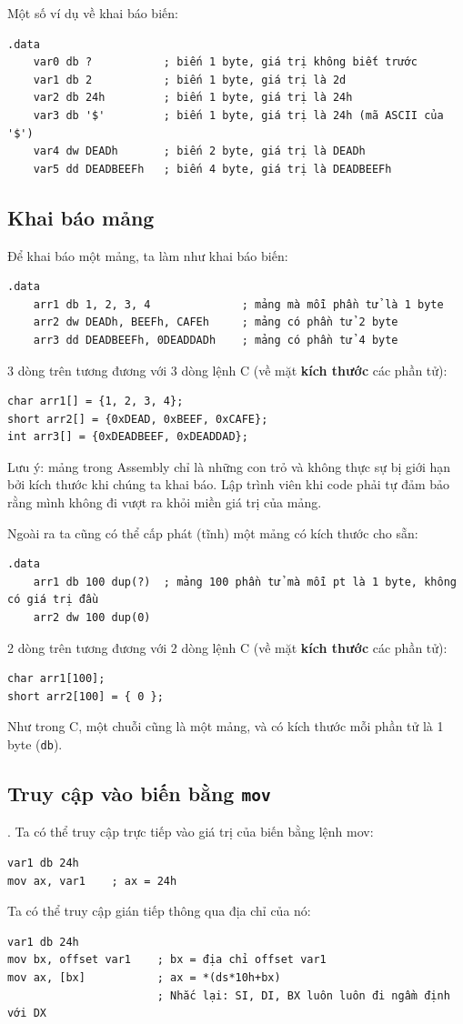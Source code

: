 \documentclass[12pt]{report}
\newcommand{\code}[1]{\texttt{#1}}
\begin{document}
Một số ví dụ về khai báo biến:
\begin{verbatim}
.data 
    var0 db ?           ; biến 1 byte, giá trị không biết trước
    var1 db 2           ; biến 1 byte, giá trị là 2d
    var2 db 24h         ; biến 1 byte, giá trị là 24h
    var3 db '$'         ; biến 1 byte, giá trị là 24h (mã ASCII của '$')
    var4 dw DEADh       ; biến 2 byte, giá trị là DEADh
    var5 dd DEADBEEFh   ; biến 4 byte, giá trị là DEADBEEFh
\end{verbatim}

\subsection{Khai báo mảng}
Để khai báo một mảng, ta làm như khai báo biến:
\begin{verbatim}
.data
    arr1 db 1, 2, 3, 4              ; mảng mà mỗi phần tử là 1 byte
    arr2 dw DEADh, BEEFh, CAFEh     ; mảng có phần tử 2 byte
    arr3 dd DEADBEEFh, 0DEADDADh    ; mảng có phần tử 4 byte
\end{verbatim}
3 dòng trên tương đương với 3 dòng lệnh C (về mặt \textbf{kích thước} các phần tử):
\begin{verbatim}
char arr1[] = {1, 2, 3, 4};
short arr2[] = {0xDEAD, 0xBEEF, 0xCAFE};
int arr3[] = {0xDEADBEEF, 0xDEADDAD};
\end{verbatim}

Lưu ý: mảng trong Assembly chỉ là những con trỏ và không thực sự bị giới hạn bởi kích thước khi chúng ta khai báo. Lập trình viên khi code phải tự đảm bảo rằng mình không đi vượt ra khỏi miền giá trị của mảng.

Ngoài ra ta cũng có thể cấp phát (tĩnh) một mảng có kích thước cho sẵn:
\begin{verbatim}
.data
    arr1 db 100 dup(?)  ; mảng 100 phần tử mà mỗi pt là 1 byte, không có giá trị đầu
    arr2 dw 100 dup(0)
\end{verbatim}
2 dòng trên tương đương với 2 dòng lệnh C (về mặt \textbf{kích thước} các phần tử):
\begin{verbatim}
char arr1[100];
short arr2[100] = { 0 }; 
\end{verbatim}

Như trong C, một chuỗi cũng là một mảng, và có kích thước mỗi phần tử là 1 byte (\code{db}).

\subsection{Truy cập vào biến bằng \code{mov}}.
Ta có thể truy cập trực tiếp vào giá trị của biến bằng lệnh mov:
\begin{verbatim}
var1 db 24h
mov ax, var1    ; ax = 24h
\end{verbatim}
Ta có thể truy cập gián tiếp thông qua địa chỉ của nó:
\begin{verbatim}
var1 db 24h            
mov bx, offset var1    ; bx = địa chỉ offset var1
mov ax, [bx]           ; ax = *(ds*10h+bx) 
                       ; Nhắc lại: SI, DI, BX luôn luôn đi ngầm định với DX
\end{verbatim}
\end{document}
